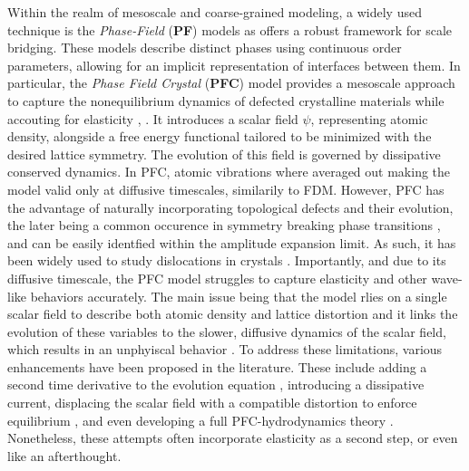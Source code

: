 \documentclass[11pt]{article}
\begin{document}
Within the realm of mesoscale and coarse-grained modeling, a widely used technique is the \emph{Phase-Field} (\textbf{PF}) models as offers a robust framework for scale bridging. These models describe distinct phases using continuous order parameters, allowing for an implicit representation of interfaces between them. In particular, the \emph{Phase Field Crystal} (\textbf{PFC}) model provides a mesoscale approach to capture the nonequilibrium dynamics of defected crystalline materials while accouting for elasticity \parencite{elderModelingElasticity2002}, \parencite{elderModelingelastic2004}. It introduces a scalar field $\psi$, representing atomic density, alongside a free energy functional tailored to be minimized with the desired lattice symmetry. The evolution of this field is governed by dissipative conserved dynamics. In PFC, atomic vibrations where averaged out making the model valid only at diffusive timescales, similarily to FDM. However, PFC has the advantage of naturally incorporating topological defects and their evolution, the later being a common occurence in symmetry breaking phase transitions \parencite{anghelutaAnisotropicvelocity2012}, and can be easily identfied within the amplitude expansion limit. As such, it has been widely used to study dislocations in crystals \parencite{skogvollphasefield2022}. Importantly, and due to its diffusive timescale, the PFC model struggles to capture elasticity and other wave-like behaviors accurately. The main issue being that the model rlies on a single scalar field to describe both atomic density and lattice distortion and it links the evolution of these variables to the slower, diffusive dynamics of the scalar field, which results in an unphyiscal behavior \parencite{acharyaElasticityphase2022}. To address these limitations, various enhancements have been proposed in the literature. These include adding a second time derivative to the evolution equation \parencite{stefanovicPhaseFieldCrystals2006}, introducing a dissipative current, displacing the scalar field with a compatible distortion to enforce equilibrium \parencite{skaugenSeparationElastic2018}, and even developing a full PFC-hydrodynamics theory \parencite{skogvollHydrodynamicphase2022}. Nonetheless, these attempts often incorporate elasticity as a second step, or even like an afterthought.\\
\end{document}

